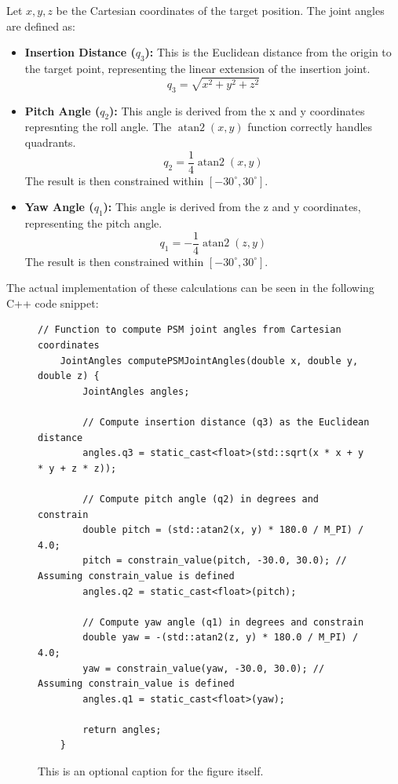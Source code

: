 Let $x, y, z$ be the Cartesian coordinates of the target position. The joint angles are defined as:

\begin{itemize}
    \item \textbf{Insertion Distance ($q_3$):} This is the Euclidean distance from the origin to the target point, representing the linear extension of the insertion joint.
    $$q_3 = \sqrt{x^2 + y^2 + z^2}$$
    \item \textbf{Pitch Angle ($q_2$):} This angle is derived from the x and y coordinates represnting the roll angle. The $\operatorname{atan2}(x, y)$ function correctly handles quadrants.
    $$q_2 = \frac{1}{4} \operatorname{atan2}(x, y)$$
    The result is then constrained within $[-30^\circ, 30^\circ]$.
    \item \textbf{Yaw Angle ($q_1$):} This angle is derived from the z and y coordinates, representing the pitch angle.
    $$q_1 = -\frac{1}{4} \operatorname{atan2}(z, y)$$
    The result is then constrained within $[-30^\circ, 30^\circ]$.
\end{itemize}


The actual implementation of these calculations can be seen in the following C++ code snippet:
\begin{figure}[H] %
    \centering %
    \begin{lstlisting}[caption={C++ Function for Joint Angle Calculation}, label={lst:joint_angle_calc}]
    // Function to compute PSM joint angles from Cartesian coordinates
    JointAngles computePSMJointAngles(double x, double y, double z) {
        JointAngles angles;

        // Compute insertion distance (q3) as the Euclidean distance
        angles.q3 = static_cast<float>(std::sqrt(x * x + y * y + z * z));

        // Compute pitch angle (q2) in degrees and constrain
        double pitch = (std::atan2(x, y) * 180.0 / M_PI) / 4.0;
        pitch = constrain_value(pitch, -30.0, 30.0); // Assuming constrain_value is defined
        angles.q2 = static_cast<float>(pitch);

        // Compute yaw angle (q1) in degrees and constrain
        double yaw = -(std::atan2(z, y) * 180.0 / M_PI) / 4.0;
        yaw = constrain_value(yaw, -30.0, 30.0); // Assuming constrain_value is defined
        angles.q1 = static_cast<float>(yaw);

        return angles;
    }
    \end{lstlisting}
    \caption{This is an optional caption for the figure itself.} %
    \label{fig:joint_angle_listing} %
\end{figure}



